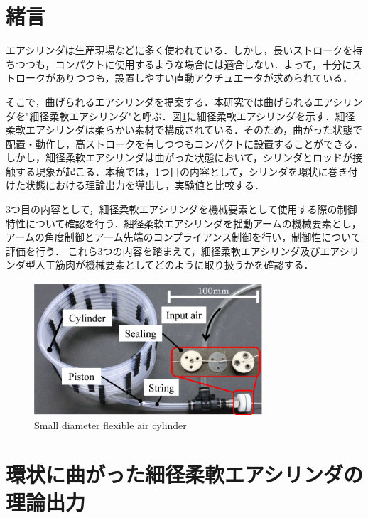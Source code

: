 \section{緒言}%
エアシリンダは生産現場などに多く使われている．しかし，長いストロークを持ちつつも，コンパクトに使用するような場合には適合しない．よって，十分にストロークがありつつも，設置しやすい直動アクチュエータが求められている．
\par
そこで，曲げられるエアシリンダを提案する．本研究では曲げられるエアシリンダを"細径柔軟エアシリンダ"と呼ぶ．図\ref{Small diameter flexible air cylinder}に細径柔軟エアシリンダを示す．細径柔軟エアシリンダは柔らかい素材で構成されている．そのため，曲がった状態で配置・動作し，高ストロークを有しつつもコンパクトに設置することができる．しかし，細径柔軟エアシリンダは曲がった状態において，シリンダとロッドが接触する現象が起こる．本稿では，1つ目の内容として，シリンダを環状に巻き付けた状態における理論出力を導出し，実験値と比較する．
\par
3つ目の内容として，細径柔軟エアシリンダを機械要素として使用する際の制御特性について確認を行う．細径柔軟エアシリンダを揺動アームの機械要素とし，アームの角度制御とアーム先端のコンプライアンス制御を行い，制御性について評価を行う．
これら3つの内容を踏まえて，細径柔軟エアシリンダ及びエアシリンダ型人工筋肉が機械要素としてどのように取り扱うかを確認する．

\begin{figure}[b]
  \centering
  \includegraphics[width=85mm]{_pdf/細径柔軟エアシリンダ-１本.pdf}
  \caption{Small diameter flexible air cylinder}
  \label{Small diameter flexible air cylinder}
\end{figure}

\section{環状に曲がった細径柔軟エアシリンダの理論出力}%
